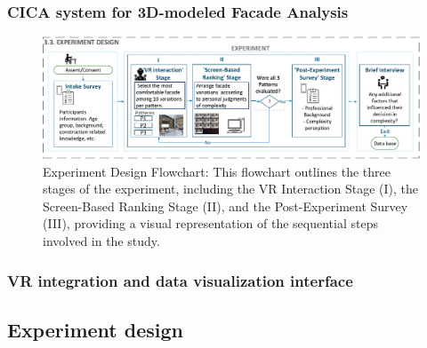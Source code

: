 \documentclass[final,5p,times]{elsarticle}%
\begin{document}
\begin{linenumbers}
    \subsubsection{CICA system for 3D-modeled Facade Analysis}
    \label{subsubsec:CICAfor3DmodeledFacades}
    

    \begin{figure}[htb]
        \centering
        \includegraphics[width= \linewidth]{Images/FlowchartExperiment}
          \caption{Experiment Design Flowchart: This flowchart outlines the three stages of the experiment, including the VR Interaction Stage (I), the Screen-Based Ranking Stage (II), and the Post-Experiment Survey (III), providing a visual representation of the sequential steps involved in the study.}
          \label{fig:ExperimentFlowchart}
    \end{figure}

    \subsubsection{VR integration and data visualization interface}
    \label{subsubsec:VR_integration}
    



    \subsection{Experiment design}
    \label{subsec:Experiment_design}
    


\end{linenumbers}
\end{document}
